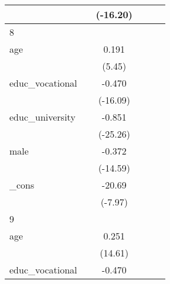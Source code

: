 {\begin{tabular}{l*{5}{c}}
            &                     &    (-16.20)         &                     &                     &                     \\
\hline
8           &                     &                     &                     &                     &                     \\
age         &                     &       0.191\sym{***}&                     &                     &                     \\
            &                     &      (5.45)         &                     &                     &                     \\
[1em]
educ\_vocational&                     &      -0.470\sym{***}&                     &                     &                     \\
            &                     &    (-16.09)         &                     &                     &                     \\
[1em]
educ\_university&                     &      -0.851\sym{***}&                     &                     &                     \\
            &                     &    (-25.26)         &                     &                     &                     \\
[1em]
male        &                     &      -0.372\sym{***}&                     &                     &                     \\
            &                     &    (-14.59)         &                     &                     &                     \\
[1em]
\_cons      &                     &      -20.69\sym{***}&                     &                     &                     \\
            &                     &     (-7.97)         &                     &                     &                     \\
\hline
9           &                     &                     &                     &                     &                     \\
age         &                     &       0.251\sym{***}&                     &                     &                     \\
            &                     &     (14.61)         &                     &                     &                     \\
[1em]
educ\_vocational&                     &      -0.470\sym{***}&                     &                     &                     \\

\end{tabular}}
